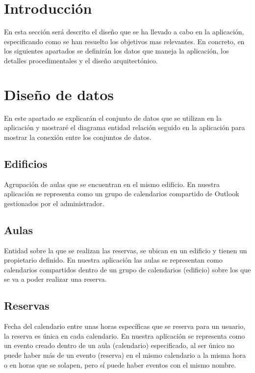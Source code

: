 
\section{Introducción}
En esta sección será descrito el diseño que se ha llevado a cabo en la aplicación, especificando como se han resuelto los objetivos mas relevantes. En concreto, en los siguientes apartados se definirán los datos que maneja la aplicación, los detalles procedimentales y el diseño arquitectónico.
\section{Diseño de datos}
En este apartado se explicarán el conjunto de datos que se utilizan en la aplicación y mostraré el diagrama entidad relación seguido en la aplicación para mostrar la conexión entre los conjuntos de datos.


\subsection{Edificios}
Agrupación de aulas que se encuentran en el mismo edificio. En nuestra aplicación se representa como un grupo de calendarios compartido de Outlook gestionados por el administrador.

\subsection{Aulas}
Entidad sobre la que se realizan las reservas, se ubican en un edificio y tienen un propietario definido. En nuestra aplicación las aulas se representan como calendarios compartidos dentro de un grupo de calendarios (edificio) sobre los que se va a poder realizar una reserva.

\subsection{Reservas}
Fecha del calendario entre unas horas específicas que se reserva para un usuario, la reserva es única en cada calendario. En nuestra aplicación se representa como un evento creado dentro de un aula (calendario) especificado, al ser único no puede haber más de un evento (reserva) en el mismo calendario a la misma hora o en horas que se solapen, pero sí puede haber eventos con el mismo nombre.


